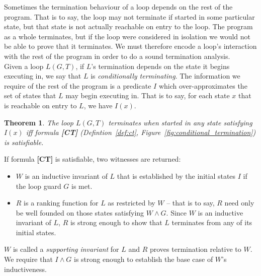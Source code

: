 \documentclass[preprint]{sigplanconf}
\newtheorem{theorem}{Theorem}
\theoremstyle{definition}
\begin{document}
Sometimes the termination behaviour of a loop depends on the rest of the program.  That is to say,
the loop may not terminate if started in some particular state, but that state is
not actually reachable on entry to the loop.  The program as a whole
terminates, but if the loop were considered in isolation we would not be able to prove that
it terminates. We must therefore encode a loop's interaction with the rest of the program 
in order to do a sound termination analysis.\\

\iffalse
Let us assume that we have done some preprocessing of our program which has identified
loops, straight line code blocks and the control flow between these.  In particular,
the control flow analysis has determined which order these code blocks execute in,
and the nesting structure of the loops.
\fi

Given a loop $L(G,T)$, if $L$'s termination depends on the state it begins
executing in, we say that $L$ is \emph{conditionally terminating}.
The information we require of the rest of the program is a predicate $I$ which
over-approximates the set of states that $L$ may begin executing in.
That is to say, for each state $x$ that is reachable on entry to $L$,
we have $I(x)$.

\begin{theorem}
\label{thm:ct}
 The loop $L(G, T)$ terminates when started in any state satisfying $I(x)$ iff formula {\bf [CT]}
 (Defintion~\ref{def:ct}, Figure~\ref{fig:conditional_termination}) is satisfiable.
\end{theorem}
% 

If formula {\bf [CT]} is satisfiable, two witnesses are returned:
\begin{itemize}
\item $W$ is an inductive invariant of $L$ that is established by the initial states $I$ if the loop
guard $G$ is met.
\item $R$ is a ranking function for $L$ as restricted by $W$ -- that is to say, $R$ need only
be well founded on those states satisfying $W \wedge G$.  Since $W$ is an inductive invariant of $L$,
$R$ is strong enough to show that $L$ terminates from any of its initial states.
\end{itemize}

$W$ is called a \emph{supporting invariant} for $L$ and $R$ proves termination relative to $W$.
We require that $I \wedge G$ is strong enough to establish the base case of $W$'s inductiveness.
\end{document}
